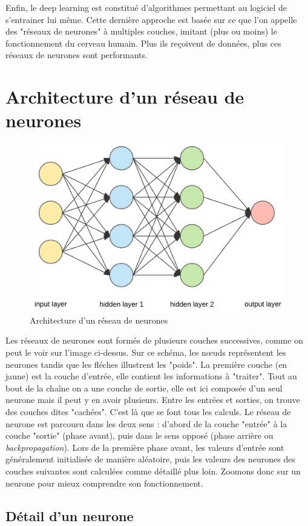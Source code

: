 	Enfin, le deep learning est constitué d'algorithmes permettant au logiciel de s'entrainer lui même. Cette dernière approche est basée sur ce que l'on appelle des "réseaux de neurones" à multiples couches, imitant (plus ou moins) le fonctionnement du cerveau humain. Plus ils reçoivent de données, plus ces réseaux de neurones sont performants.
	
\section{Architecture d'un réseau de neurones}

	\begin{figure}[H]
		\centering
		\includegraphics[width=0.75\linewidth]{images/reseau}
		\caption{Architecture d'un réseau de neurones}
	\end{figure}

	Les réseaux de neurones sont formés de plusieurs couches successives, comme on peut le voir sur l'image ci-dessus. Sur ce schéma, les n\oe uds représentent les neurones tandis que les fléches illustrent les "poids". La première couche (en jaune) est la couche d'entrée, elle contient les informations à "traiter". Tout au bout de la chaîne on a une couche de sortie, elle est ici composée d'un seul neurone mais il peut y en avoir plusieurs. Entre les entrées et sorties, on trouve des couches dites "cachées". C'est là que se font tous les calculs. Le réseau de neurone est parcouru dans les deux sens : d'abord de la couche "entrée" à la couche "sortie" (phase avant), puis dans le sens opposé (phase arrière ou \textit{backpropagation}). Lors de la première phase avant, les valeurs d'entrée sont généralement initialisée de manière aléatoire, puis les valeurs des neurones des couches suivantes sont calculées comme détaillé plus loin. Zoomons donc sur un neurone pour mieux comprendre son fonctionnement.

\subsection{Détail d'un neurone}
	
